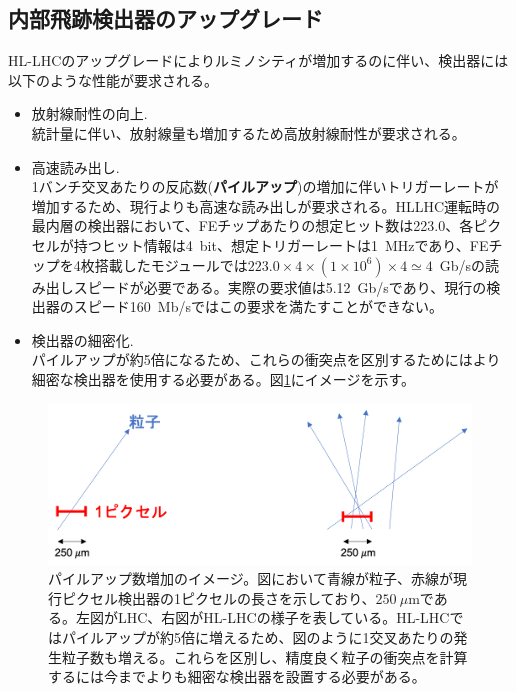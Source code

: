 \subsection{内部飛跡検出器のアップグレード}
HL-LHCのアップグレードによりルミノシティが増加するのに伴い、検出器には以下のような性能が要求される。

\begin{itemize}
  \item 放射線耐性の向上.\\
  統計量に伴い、放射線量も増加するため高放射線耐性が要求される。
  \item 高速読み出し.\\
  1バンチ交叉あたりの反応数(\textbf{パイルアップ})の増加に伴いトリガーレートが増加するため、現行よりも高速な読み出しが要求される。HLLHC運転時の最内層の検出器において、FEチップあたりの想定ヒット数は223.0、各ピクセルが持つヒット情報は4~bit、想定トリガーレートは1~MHzであり、FEチップを4枚搭載したモジュールでは$223.0\times 4 \times (1\times 10^6) \times 4 \simeq 4$~Gb/sの読み出しスピードが必要である。実際の要求値は5.12~Gb/sであり、現行の検出器のスピード160~Mb/sではこの要求を満たすことができない。
  \item 検出器の細密化.\\
  パイルアップが約5倍になるため、これらの衝突点を区別するためにはより細密な検出器を使用する必要がある。図\ref{detector_posi_res}にイメージを示す。
\end{itemize}

\begin{figure}[bpt]\centering
\includegraphics[width=12cm]{./detector_posi_res.png}
\caption[パイルアップ数増加のイメージ]{パイルアップ数増加のイメージ。図において青線が粒子、赤線が現行ピクセル検出器の1ピクセルの長さを示しており、$250~\mu$mである。左図がLHC、右図がHL-LHCの様子を表している。HL-LHCではパイルアップが約5倍に増えるため、図のように1交叉あたりの発生粒子数も増える。これらを区別し、精度良く粒子の衝突点を計算するには今までよりも細密な検出器を設置する必要がある。}
\label{detector_posi_res}
\end{figure}

